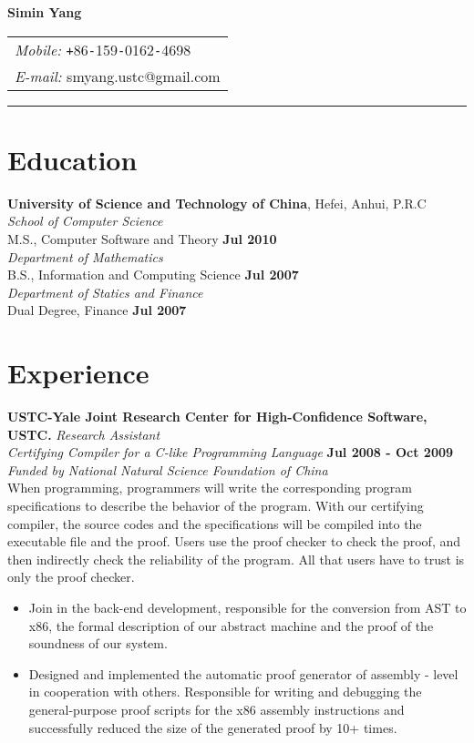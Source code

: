 \documentclass[margin]{res}
\newcommand{\ustc}{University of Science and Technology of China}
\newcommand{\hefei}{Hefei, Anhui, P.R.C}
\begin{document}
{\bfseries \huge Simin Yang}
\hfill
\begin{tabular}{l}
\textit{Mobile: } \texttt{+}86\texttt{-}159\texttt{-}0162\texttt{-}4698\\
\textit{E-mail: }{smyang.ustc@gmail.com}
\end{tabular}
\rule{\columnwidth}{1pt}

\section{Education}
\textbf{\ustc}, \hefei\\[2mm]
{\it School of Computer Science}\\
M.S., Computer Software and Theory \hfill {\bf Jul 2010}\\[1.5mm]
{\it Department of Mathematics}\\
B.S., Information and Computing Science \hfill{\bf Jul 2007}\\[1.5mm]
{\it Department of Statics and Finance}\\
Dual Degree, Finance \hfill {\bf Jul 2007}

\section{Experience}
\textbf{USTC-Yale Joint Research Center for High-Confidence Software, USTC.} {\em Research Assistant}\\[2mm]
{\em \large Certifying Compiler for a C-like Programming Language} \hfill {\bf Jul 2008 - Oct 2009}\\
\hspace*{\fill} {\em Funded by National Natural Science Foundation of China}\\
When programming, programmers will write the corresponding program specifications to describe the behavior of the program. With our certifying compiler, the source codes and the specifications will be compiled into the executable file and the proof. Users use the proof checker to check the proof, and then indirectly check the reliability of the program. All that users have to trust is only the proof checker.
\\[-2.5mm]
\begin{itemize}
\item Join in the back-end development, responsible for the conversion from AST to x86, the formal description of our abstract machine and the proof of the soundness of our system.

\item Designed and implemented the automatic proof generator of assembly - level in cooperation with others. Responsible for writing and debugging the general-purpose proof scripts for the x86 assembly instructions and successfully reduced the size of the generated proof by 10+ times.
\end{itemize}
\vspace{1mm}
\end{document}
